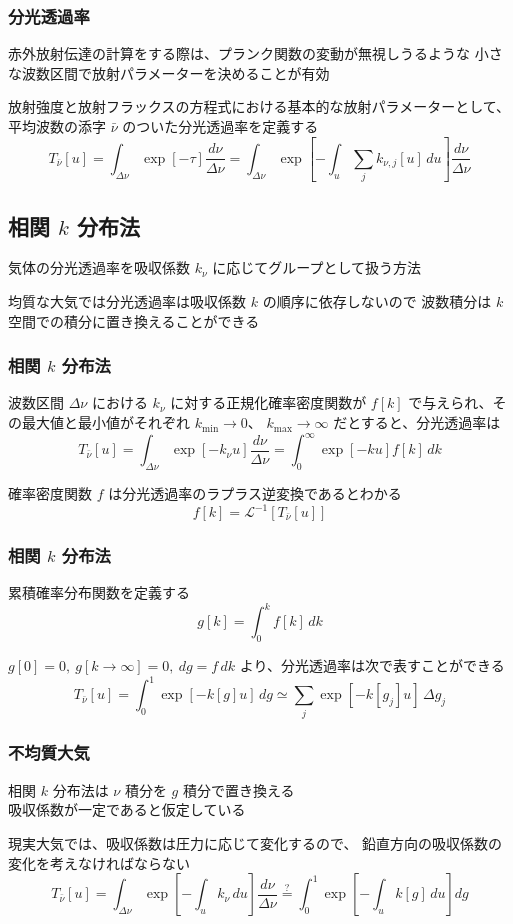 \documentclass[unicode,colorlinks]{beamer}
\begin{document}
\begin{frame}
	\frametitle{分光透過率}
	赤外放射伝達の計算をする際は、プランク関数の変動が無視しうるような
	小さな波数区間で放射パラメーターを決めることが有効

	放射強度と放射フラックスの方程式における基本的な放射パラメーターとして、
	平均波数の添字 $\bar\nu$ のついた分光透過率を定義する
	\[
		T_{\bar\nu}[u]
		=\int_{\Delta\nu}\exp[-\tau]\frac{d\nu}{\Delta\nu}
		=\int_{\Delta\nu}\exp\left[-\int_u\sum_j k_{\nu,j}[u]\,du\right]\frac{d\nu}{\Delta\nu}
	\]
\end{frame}

\begin{frame}
	\section{相関 $k$ 分布法}
	気体の分光透過率を吸収係数 $k_\nu$ に応じてグループとして扱う方法

	均質な大気では分光透過率は吸収係数 $k$ の順序に依存しないので
	波数積分は $k$ 空間での積分に置き換えることができる
\end{frame}

\begin{frame}
	\frametitle{相関 $k$ 分布法}
	波数区間 $\Delta\nu$ における $k_\nu$ に対する正規化確率密度関数が
	$f[k]$ で与えられ、その最大値と最小値がそれぞれ $k_{\mathrm{min}}\to0$、
	$k_{\mathrm{max}}\to\infty$ だとすると、分光透過率は
	\[T_{\bar\nu}[u]=\int_{\Delta\nu}\exp[-k_\nu u]\frac{d\nu}{\Delta\nu}=\int^\infty_0 \exp[-ku]f[k]\,dk\]

	確率密度関数 $f$ は分光透過率のラプラス逆変換であるとわかる
	\[f[k]=\mathcal{L}^{-1}[T_{\bar\nu}[u]]\]
\end{frame}

\begin{frame}
	\frametitle{相関 $k$ 分布法}
	累積確率分布関数を定義する
	\[g[k]=\int^k_0 f[k]\,dk\]

	$g[0]=0,\ g[k\to\infty]=0,\ dg=f\,dk$ より、分光透過率は次で表すことができる
	\[T_{\bar\nu}[u]=\int^1_0 \exp[-k[g]u]\,dg\simeq\sum_j\exp[-k[g_j]u]\,\Delta g_j\]
\end{frame}

\begin{frame}
	\frametitle{不均質大気}
	相関 $k$ 分布法は $\nu$ 積分を $g$ 積分で置き換える\\
	吸収係数が一定であると仮定している

	現実大気では、吸収係数は圧力に応じて変化するので、
	鉛直方向の吸収係数の変化を考えなければならない
	\[
		T_{\bar\nu}[u]
		=\int_{\Delta\nu}\exp\left[-\int_u k_\nu\,du\right]\frac{d\nu}{\Delta\nu}
		\stackrel{?}{=}\int^1_0\exp\left[-\int_uk[g]\,du\right]dg
	\]
\end{frame}
\end{document}
